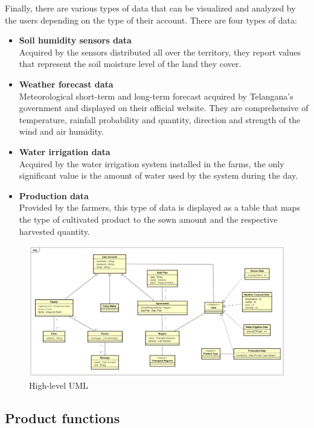 \documentclass[table, 12pt]{article}
\begin{document}
Finally, there are various types of data that can be visualized and analyzed by the users
depending on the type of their account.
There are four types of data:
\begin{itemize}
    \item \textbf{Soil humidity sensors data}\\
    Acquired by the sensors distributed all over the territory, they report values that represent the soil moisture level of the land they cover.
    \item \textbf{Weather forecast data}\\
    Meteorological short-term and long-term forecast acquired by Telangana's government and displayed on their official website. They are comprehensive of temperature, rainfall probability and quantity, direction and strength of the wind and air humidity.
    \item \textbf{Water irrigation data}\\
    Acquired by the water irrigation system installed in the farms, the only significant value is the amount of water used by the system during the day.
    \item \textbf{Production data}\\
    Provided by the farmers, this type of data is displayed as a table that maps the type of cultivated product to the sown amount and the respective harvested quantity.
\end{itemize}
\begin{center}
    \begin{figure}[H]
        \includegraphics[scale=0.45, center]{assets/UML/UML.png}
        \caption{High-level UML}
        \label{fig: UML}
    \end{figure}
\end{center}
\subsection{Product functions}
\label{product_functions}
\end{document}
